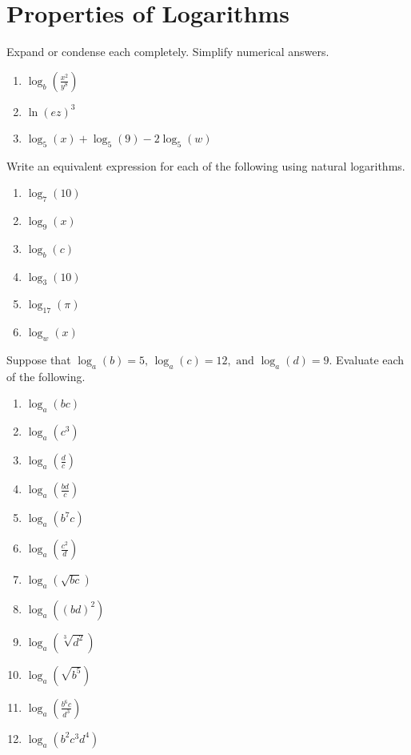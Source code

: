 \chapter{Properties of Logarithms}

Expand or condense each completely. Simplify numerical answers.
\begin{enumerate}
	\item $\log_b\left(\frac{x^2}{y^8}\right)$
	\item $\ln\left(ez\right)^3$
	\item $\log_5(x) + \log_5(9) - 2\log_5(w)$
\setcounter{Review}{\value{enumi}}
\end{enumerate}

Write an equivalent expression for each of the following using natural logarithms.
\begin{enumerate}
\setcounter{enumi}{\value{Review}}
	\item $\log_7(10)$
	\item $\log_9(x)$
	\item $\log_b(c)$
    \item $\log_3(10)$
    \item $\log_{17}(\pi)$    
    \item $\log_{w}(x)$
\setcounter{Review}{\value{enumi}}
\end{enumerate}

Suppose that $\log_a(b) = 5, \, \log_a(c) = 12, \text{ and } \log_a(d) = 9$. Evaluate each of the following.
\begin{enumerate}	\setcounter{enumi}{\value{Review}}
	\item $\log_a(bc)$
    \item $\log_a(c^3)$
    \item $\log_a\left(\frac{d}{c}\right)$
    \item $\log_a\left(\frac{bd}{c}\right)$
    \item $\log_a\left(b^7c\right)$
    \item $\log_a\left(\frac{c^2}{d}\right)$
    \item $\log_a\left(\sqrt{bc}\right)$
    \item $\log_a\left((bd)^2\right)$
    \item $\log_a\left(\sqrt[3]{d^2}\right)$
    \item $\log_a\left(\sqrt{b^5}\right)$
    \item $\log_a\left(\frac{b^6c}{d^3}\right)$
    \item $\log_a\left(b^2c^3d^4\right)$
\end{enumerate}
\setcounter{Review}{\value{enumi}}

